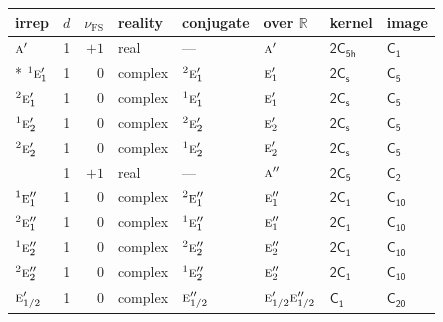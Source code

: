 \documentclass[10pt,a4paper]{article}
\makeatletter
\def\grouprule#1#2{\noalign{\marks\LTgroupmarks{\the\belowrulesep}\nobreak\vskip#1%
  \vskip\aboverulesep}\multispan\LT@cols\unskip{\leaders\hrule\@height#2\hfill\kern\z@}\cr
  \noalign{\penalty\LTrulebreak\vskip\belowrulesep\global\@lastruleclass\z@}}
\numberwithin{equation}{section}
\newcommand{\grp}[1]{\mathsf{#1}}
\newcommand{\irr}[1]{\text{\normalfont\scshape #1}}
\newcommand{\conjpair}[1]{{}^{#1}}
\newcommand{\detbox}[1]{{\setlength{\fboxsep}{1pt}\fbox{#1}}}
\newcommand{\fsind}{\nu_{\mathrm{FS}}}
\makeatother
\begin{document}
{\small\renewcommand{\arraystretch}{1.25}\setlength{\tabcolsep}{4pt}\begin{longtable}{@{}lrrlllll@{}}\toprule
irrep & $d$ & $\fsind$ & reality & conjugate & over $\mathbb{R}$ & kernel & image\\\midrule\endhead
\bottomrule\endfoot\endlastfoot
$\irr{a}'$ & 1 & $+1$ & real & --- & $\irr{a}'$ & \href{2C5h.pdf}{$\grp{2C_{5h}}$} & \href{../../../rotation/data/pdf/C1.pdf}{$\grp{C_{1}}$}\\*
$\conjpair{1}\irr{e}_{1}'$ & 1 & $0$ & complex & $\conjpair{2}\irr{e}_{1}'$ & $\irr{e}_{1}'$ & \href{2C1v.pdf}{$\grp{2C_{s}}$} & \href{../../../rotation/data/pdf/C5.pdf}{$\grp{C_{5}}$}\\
$\conjpair{2}\irr{e}_{1}'$ & 1 & $0$ & complex & $\conjpair{1}\irr{e}_{1}'$ & $\irr{e}_{1}'$ & \href{2C1v.pdf}{$\grp{2C_{s}}$} & \href{../../../rotation/data/pdf/C5.pdf}{$\grp{C_{5}}$}\\
$\conjpair{1}\irr{e}_{2}'$ & 1 & $0$ & complex & $\conjpair{2}\irr{e}_{2}'$ & $\irr{e}_{2}'$ & \href{2C1v.pdf}{$\grp{2C_{s}}$} & \href{../../../rotation/data/pdf/C5.pdf}{$\grp{C_{5}}$}\\
$\conjpair{2}\irr{e}_{2}'$ & 1 & $0$ & complex & $\conjpair{1}\irr{e}_{2}'$ & $\irr{e}_{2}'$ & \href{2C1v.pdf}{$\grp{2C_{s}}$} & \href{../../../rotation/data/pdf/C5.pdf}{$\grp{C_{5}}$}\\
\detbox{$\irr{a}''$} & 1 & $+1$ & real & --- & $\irr{a}''$ & \href{2C5.pdf}{$\grp{2C_{5}}$} & \href{../../../rotation/data/pdf/C2.pdf}{$\grp{C_{2}}$}\\
$\conjpair{1}\irr{e}_{1}''$ & 1 & $0$ & complex & $\conjpair{2}\irr{e}_{1}''$ & $\irr{e}_{1}''$ & \href{2C1.pdf}{$\grp{2C_{1}}$} & \href{../../../rotation/data/pdf/C10.pdf}{$\grp{C_{10}}$}\\
$\conjpair{2}\irr{e}_{1}''$ & 1 & $0$ & complex & $\conjpair{1}\irr{e}_{1}''$ & $\irr{e}_{1}''$ & \href{2C1.pdf}{$\grp{2C_{1}}$} & \href{../../../rotation/data/pdf/C10.pdf}{$\grp{C_{10}}$}\\
$\conjpair{1}\irr{e}_{2}''$ & 1 & $0$ & complex & $\conjpair{2}\irr{e}_{2}''$ & $\irr{e}_{2}''$ & \href{2C1.pdf}{$\grp{2C_{1}}$} & \href{../../../rotation/data/pdf/C10.pdf}{$\grp{C_{10}}$}\\
$\conjpair{2}\irr{e}_{2}''$ & 1 & $0$ & complex & $\conjpair{1}\irr{e}_{2}''$ & $\irr{e}_{2}''$ & \href{2C1.pdf}{$\grp{2C_{1}}$} & \href{../../../rotation/data/pdf/C10.pdf}{$\grp{C_{10}}$}\\
\grouprule{0pt}{\lightrulewidth}
$\irr{e}_{1/2}'$ & 1 & $0$ & complex & $\irr{e}_{1/2}''$ & $\irr{e}_{1/2}'\irr{e}_{1/2}''$ & \href{C1.pdf}{$\grp{C_{1}}$} & $\grp{C_{20}}$\\

\end{longtable}}
\end{document}
